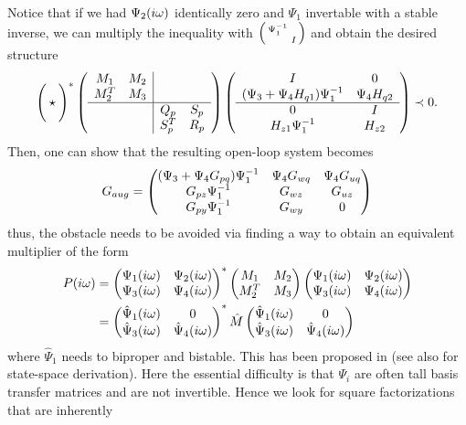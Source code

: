 Notice that if we had $\Psi_2(i\omega)$ identically zero and $\Psi_1$ invertable with a stable inverse, we can multiply 
the inequality with $\begin{psmallmatrix}\Psi_1^{-1}&\\&I\end{psmallmatrix}$ and obtain the desired structure 
\[
\Bigg(\star\Bigg)^*
\left(
\begin{array}{cc|cc}
M_1&M_2&&\\M^T_2&M_3&&\\\hline &&Q_p&S_p\\&&S_p^T&R_p
\end{array}
\right)
\left(
\begin{array}{cc}
	I&0\\
	(\Psi_3 + \Psi_4H_{q1})\Psi_1^{-1} &\Psi_4H_{q2}\\\hline
	0& I\\
	H_{z1}\Psi_1^{-1} &H_{z2}
\end{array}
\right)
\prec 0.
\]
Then, one can show that the resulting open-loop system becomes 
\begin{equation}
G_{aug} = \begin{pmatrix}
(\Psi_3 + \Psi_4G_{pq})\Psi_1^{-1} &\Psi_4G_{wq} &\Psi_4G_{uq}\\
G_{pz}\Psi_1^{-1}                  &G_{wz}       &G_{uz}\\
G_{py}\Psi_1^{-1}                  &G_{wy}       &0\\
\end{pmatrix}
\label{eq:augplant}
\end{equation}
thus, the obstacle needs to be avoided via finding a way to obtain an equivalent multiplier of the form
\begin{align}
P(i\omega) &= 
\begin{pmatrix}\Psi_1(i\omega)&\Psi_2(i\omega)\\ \Psi_3(i\omega)&\Psi_4(i\omega)\end{pmatrix}^*
\begin{pmatrix}M_1&M_2\\M^T_2&M_3\end{pmatrix}
\begin{pmatrix}\Psi_1(i\omega)&\Psi_2(i\omega)\\ 
       \Psi_3(i\omega)&\Psi_4(i\omega)\end{pmatrix}\\
      &= \begin{pmatrix}\hat{\Psi}_1(i\omega)&0\\ \hat{\Psi}_3(i\omega)&\hat{\Psi}_4(i\omega)\end{pmatrix}^*
         \hat{M}
         \begin{pmatrix}\hat{\Psi}_1(i\omega)&0\\ \hat{\Psi}_3(i\omega)&\hat{\Psi}_4(i\omega)\end{pmatrix}
\end{align}
where $\hat{\Psi}_1$ needs to biproper and bistable. This has been proposed in \cite{goh96,goh962} (see also
\cite{veenmanIFAC} for state-space derivation). Here the essential difficulty is that $\Psi_i$ are often 
tall basis transfer matrices and are not invertible. Hence we look for square factorizations that are inherently 
